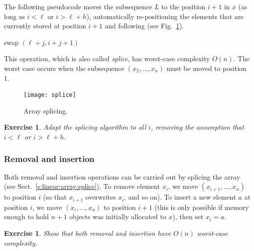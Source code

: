 \documentclass[a4paper]{book}
\theoremstyle{changebreak}                %
\newtheorem{ex}[result]{Exercise}
\begin{document}
The following pseudocode moves the subsequence $L$
to the position $i+1$ in $x$ (as long as $i<\ell$ or $i>\ell+h$),
automatically re-positioning the elements that are currently stored at
position $i+1$ and following (see Fig.~\ref{f:splice}).
\begin{algorithmic}
  \STATE swap $(\ell+j,i+j+1)$  
\ENDFOR
\end{algorithmic}
This operation, which is also called {\it splice},
has worst-case complexity $O(n)$. The worst case occurs when the
subsequence $(x_2,\ldots,x_n)$ must be moved to position 1.
\begin{figure}[!ht]
\begin{center}
\texttt{[image: splice]}
\end{center}
\caption{Array splicing.}
\label{f:splice}
\end{figure}

\begin{ex}
Adapt the splicing algorithm to all $i$, removing the assumption that
$i<\ell$ or $i>\ell+h$.
\end{ex}

\subsubsection{Removal and insertion}
Both removal and insertion
operations can be carried out by splicing the array (see
Sect.~\ref{s:linear:array:splice}). To remove element $x_i$, we move
$(x_{i+1},\ldots,x_n)$ to position $i$ (so that $x_{i+1}$ overwrites
$x_i$, and so on). To insert a new element $a$ at position $i$, we
move $(x_i,\ldots,x_n)$ to position $i+1$ (this is only possible if
memory enough to hold $n+1$ objects was initially allocated to $x$),
then set $x_i=a$. 

\begin{ex}
Show that both removal and insertion have $O(n)$ worst-case
complexity.
\end{ex}
\end{document}
